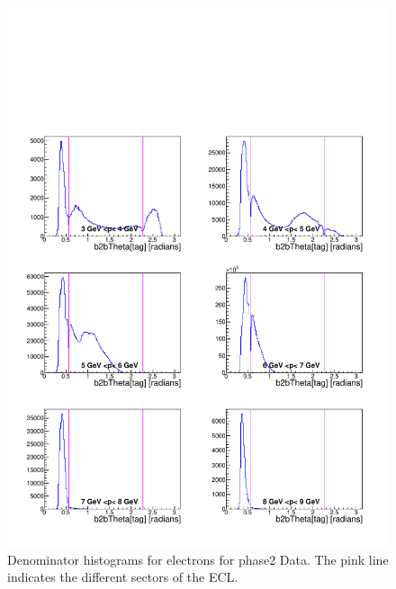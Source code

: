 \documentclass[a4paper,11pt,twosided,final,german,openbib,pdftex,listof=totoc,bibliography=totoc]{scrbook}
\begin{document}
\begin{appendix}
\begin{figure}[!htbp]
	\centering
	\includegraphics[width=\textwidth]{Plots/master/xPMThetaemD_Data}
	\caption[Momentum $\phi$ Electrons Denominator Histogram Phase2 Data]{Denominator histograms for electrons for phase2 Data. The pink line indicates the different sectors of the ECL.}
	\label{plt:PMThetaemD_Data}
\end{figure}


\end{appendix}
\end{document}
